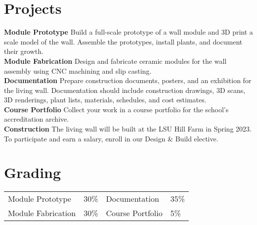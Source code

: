 \documentclass[11pt,article,oneside]{memoir}
\begin{document}
\clearpage


\section{Projects}

\noindent \textbf{Module Prototype}
Build a full-scale prototype of a wall module
and 3D print a scale model of the wall.
Assemble the prototypes, 
install plants, 
and document their growth.
\\

\noindent \textbf{Module Fabrication}
Design and fabricate ceramic modules for the wall assembly
using CNC machining and slip casting.
\\

\noindent \textbf{Documentation}
Prepare construction documents,
posters, and an exhibition for the living wall.
Documentation should include 
construction drawings, 3D scans, 3D renderings,
plant lists, materials, schedules, and cost estimates.
\\

\noindent \textbf{Course Portfolio}
Collect your work in a course portfolio 
for the school's accreditation archive.
\\

\noindent \textbf{Construction}
The living wall will be built at the LSU Hill Farm in Spring 2023.
To participate and earn a salary, enroll in our Design \& Build elective.

\section{Grading}
\vspace*{-0.4cm}
\begin{table}[H]
\begin{tabular}{@{}l r @{\hskip 2cm} l @{\hskip 0.5cm} l}
Module Prototype & 30\% & Documentation & 35\% \\
Module Fabrication & 30\% & Course Portfolio & 5\% \\
\end{tabular}
\end{table}

\end{document}
